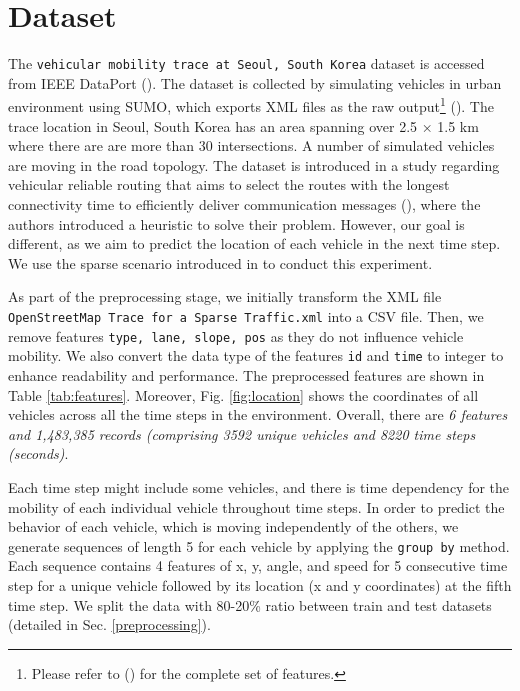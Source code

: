 \documentclass[journal,onecolumn]{IEEEtran}
\begin{document}
{\section{Dataset} \label{dataset}
The \texttt{vehicular mobility trace at Seoul, South Korea} dataset is accessed from IEEE DataPort (\cite{dataset20kumbhar}). The dataset is collected by simulating vehicles in urban environment using SUMO, which exports XML files as the raw output\footnote{Please refer to (\cite{sumo24fcd}) for the complete set of features.} (\cite{sumo24fcd}). The trace location in Seoul, South Korea has an area spanning over 2.5 × 1.5 km where there are are more than 30 intersections. A number of simulated vehicles are moving in the road topology. The dataset is introduced in a study regarding vehicular reliable routing that aims to select the routes with the longest connectivity time to efficiently deliver communication messages (\cite{lcomm21kumbhar}), where the authors introduced a heuristic to solve their problem. However, our goal is different, as we aim to predict the location of each vehicle in the next time step. We use the sparse scenario introduced in \cite{dataset20kumbhar} to conduct this experiment.

As part of the preprocessing stage, we initially transform the XML file \texttt{OpenStreetMap Trace for a Sparse Traffic.xml} into a CSV file. Then, we remove features \texttt{type, lane, slope, pos} as they do not influence vehicle mobility. We also convert the data type of the features \texttt{id} and \texttt{time} to integer to enhance readability and performance. The preprocessed features are shown in Table \ref{tab:features}. Moreover, Fig. \ref{fig:location} shows the coordinates of all vehicles across all the time steps in the environment. Overall, there are \textit{6 features and 1,483,385 records (comprising 3592 unique vehicles and 8220 time steps (seconds)}. 

Each time step might include some vehicles, and there is time dependency for the mobility of each individual vehicle throughout time steps. In order to predict the behavior of each vehicle, which is moving independently of the others, we generate sequences of length 5 for each vehicle by applying the \texttt{group by} method. Each sequence contains 4 features of x, y, angle, and speed for 5 consecutive time step for a unique vehicle followed by its location (x and y coordinates) at the fifth time step. We split the data with 80-20\% ratio between train and test datasets (detailed in Sec. \ref{preprocessing}).

}
\end{document}

